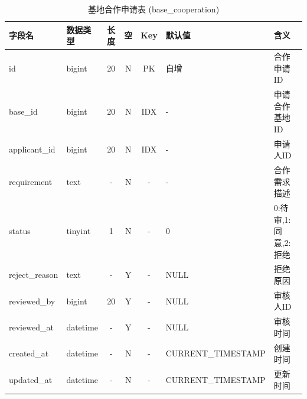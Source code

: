 \documentclass[UTF8,a4paper,12pt]{article}
\begin{document}
\begin{table}[H]
    \centering
    \caption{基地合作申请表 (base\_cooperation)}
    \label{tab:base_cooperation}
    \small
    \renewcommand{\arraystretch}{1.3}
    \begin{tabular}{|l|l|c|c|c|l|l|}
        \hline
        \rowcolor{gray!15} \textbf{字段名} & \textbf{数据类型} & \textbf{长度} & \textbf{空} & \textbf{Key} & \textbf{默认值} & \textbf{含义} \\ \hline
        id & bigint & 20 & N & PK & 自增 & 合作申请ID \\ \hline
        base\_id & bigint & 20 & N & IDX & - & 申请合作基地ID \\ \hline
        applicant\_id & bigint & 20 & N & IDX & - & 申请人ID \\ \hline
        requirement & text & - & N & - & - & 合作需求描述 \\ \hline
        status & tinyint & 1 & N & - & 0 & 0:待审,1:同意,2:拒绝 \\ \hline
        reject\_reason & text & - & Y & - & NULL & 拒绝原因 \\ \hline
        reviewed\_by & bigint & 20 & Y & - & NULL & 审核人ID \\ \hline
        reviewed\_at & datetime & - & Y & - & NULL & 审核时间 \\ \hline
        created\_at & datetime & - & N & - & CURRENT\_TIMESTAMP & 创建时间 \\ \hline
        updated\_at & datetime & - & N & - & CURRENT\_TIMESTAMP & 更新时间 \\ \hline
    \end{tabular}
\end{table}
\end{document}
